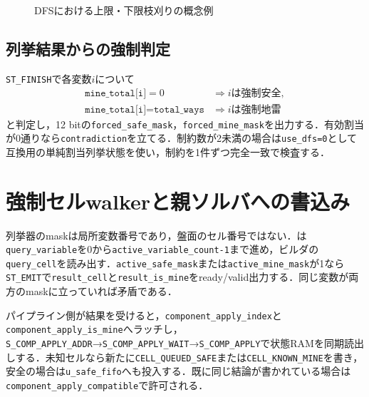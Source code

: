 \begin{figure}[tb]
  \centering
  \caption{DFSにおける上限・下限枝刈りの概念例}
  \label{fig:enumerator-prune-tree}
\end{figure}

\subsection{列挙結果からの強制判定}

\texttt{ST\_FINISH}で各変数$i$について
\begin{align}
  \texttt{mine\_total[i]}=0 &\Rightarrow i\text{は強制安全},\\
  \texttt{mine\_total[i]}=\texttt{total\_ways} &\Rightarrow i\text{は強制地雷}
\end{align}
と判定し，12 bitの\texttt{forced\_safe\_mask}，\texttt{forced\_mine\_mask}を出力する．有効割当が0通りなら\texttt{contradiction}を立てる．制約数が2未満の場合は\texttt{use\_dfs=0}として互換用の単純割当列挙状態を使い，制約を1件ずつ完全一致で検査する．

\section{強制セルwalkerと親ソルバへの書込み}
\label{sec:forced-walker}

列挙器のmaskは局所変数番号であり，盤面のセル番号ではない．は\texttt{query\_variable}を0から\texttt{active\_variable\_count-1}まで進め，ビルダの\texttt{query\_cell}を読み出す．\texttt{active\_safe\_mask}または\texttt{active\_mine\_mask}が1なら\texttt{ST\_EMIT}で\texttt{result\_cell}と\texttt{result\_is\_mine}をready/valid出力する．同じ変数が両方のmaskに立っていれば矛盾である．

パイプライン側が結果を受けると，\texttt{component\_apply\_index}と\texttt{component\_apply\_is\_mine}へラッチし，\texttt{S\_COMP\_APPLY\_ADDR}→\texttt{S\_COMP\_APPLY\_WAIT}→\texttt{S\_COMP\_APPLY}で状態RAMを同期読出しする．未知セルなら新たに\texttt{CELL\_QUEUED\_SAFE}または\texttt{CELL\_KNOWN\_MINE}を書き，安全の場合は\texttt{u\_safe\_fifo}へも投入する．既に同じ結論が書かれている場合は\texttt{component\_apply\_compatible}で許可される．

